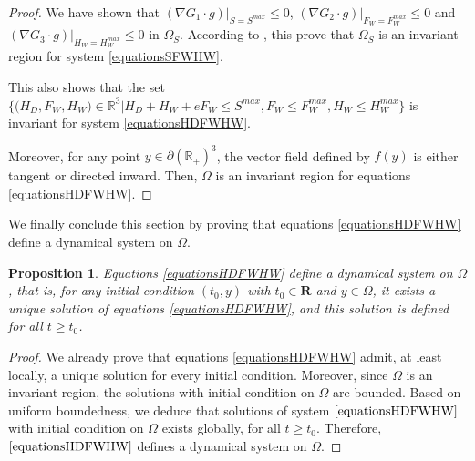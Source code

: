 \documentclass{article}
\newtheorem{prop}{Proposition}
\begin{document}
\begin{proof}
We have shown that $(\nabla G_1 \cdot g)|_{S = S^{max}} \leq 0$, $(\nabla G_2 \cdot g)|_{F_W = F_W^{max}} \leq 0$ and $(\nabla G_3 \cdot g)|_{H_W = H_W^{max}} \leq 0$ in  $\Omega_S$.  According to \cite{smoller_shock_1994}, this prove that $\Omega_S$ is an invariant region for system \eqref{equationsSFWHW}.

This also shows that the set  $\Big\{\Big(H_D, F_W, H_W \Big) \in \mathbb{R}^3  \Big|H_D + H_W + eF_W \leq S^{max}, F_W \leq F_W^{max}, H_W \leq H_W^{max} \Big\}$ is invariant for system \eqref{equationsHDFWHW}. 

Moreover, for any point $y \in \partial (\mathbb{R}_+)^3$, the vector field defined by $f(y)$ is either tangent or directed inward. Then, $\Omega$ is an invariant region for equations \eqref{equationsHDFWHW}. 
\end{proof}

We finally conclude this section by proving that equations \eqref{equationsHDFWHW} define a dynamical system on $\Omega$.

\begin{prop}
Equations \eqref{equationsHDFWHW} define a dynamical system on $\Omega$, that is, for any initial condition $(t_0, y)$ with $t_0 \in \mathbf{R}$ and $y \in \Omega$, it exists a unique solution of equations \eqref{equationsHDFWHW}, and this solution is defined for all $t \geq t_0$.
\end{prop}

\begin{proof}
We already prove that equations \eqref{equationsHDFWHW} admit, at least locally, a unique solution for every initial condition. Moreover, since $\Omega$ is an invariant region, the solutions with initial condition on $\Omega$ are bounded. Based on uniform boundedness, we deduce that solutions of system $\eqref{equationsHDFWHW}$ with initial condition on $\Omega$ exists globally, for all $t\geq t_0$. Therefore, $\eqref{equationsHDFWHW}$ defines a dynamical system on $\Omega$.
\end{proof}
\end{document}
